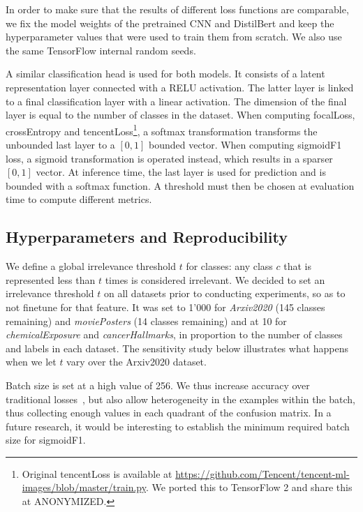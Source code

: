 In order to make sure that the results of different loss functions are comparable, we fix the model weights of the pretrained CNN and DistilBert and keep the hyperparameter values that were used to train them from scratch. We also use the same TensorFlow internal random seeds.

A similar classification head is used for both models. It consists of a latent representation layer connected with a RELU activation. The latter layer is linked to a final classification layer with a linear activation. The dimension of the final layer is equal to the number of classes in the dataset. When computing focalLoss, crossEntropy and tencentLoss\footnote{Original tencentLoss is available at \url{https://github.com/Tencent/tencent-ml-images/blob/master/train.py}. We ported this to TensorFlow 2 and share this at ANONYMIZED.}, a softmax transformation transforms the unbounded last layer to a $[0,1]$ bounded vector. When computing sigmoidF1 loss, a sigmoid transformation is operated instead, which results in a sparser $[0,1]$ vector. At inference time, the last layer is used for prediction and is bounded with a softmax function. A threshold must then be chosen at evaluation time to compute different metrics.

\subsection{Hyperparameters and Reproducibility}

We define a global irrelevance threshold $t$ for classes: any class $c$ that is represented less than $t$ times is considered irrelevant. We decided to set an irrelevance threshold $t$ on all datasets prior to conducting experiments, so as to not finetune for that feature. It was set to 1'000 for \emph{Arxiv2020} (145 classes remaining) and \emph{moviePosters} (14 classes remaining) and at 10 for \emph{chemicalExposure} and \emph{cancerHallmarks}, in proportion to the number of classes and labels in each dataset. The sensitivity study below illustrates what happens when we let $t$ vary over the Arxiv2020 dataset.

Batch size is set at a high value of 256. We thus increase accuracy over traditional losses~\cite{bigBS}, but also allow heterogeneity in the examples within the batch, thus collecting enough values in  each quadrant of the confusion matrix. In a future research, it would be interesting to establish the minimum required batch size for sigmoidF1.

